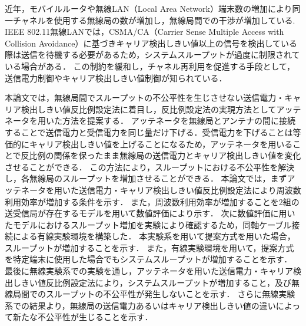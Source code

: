 \documentclass[master]{kuisthesis}		%
\date{平成28年2月8日}				%
\begin{document}
\maketitle					%

\begin{jabstract}				%
近年，モバイルルータや無線LAN（Local Area Network）端末数の増加により同一チャネルを使用する無線局の数が増加し，無線局間での干渉が増加している. 
IEEE 802.11無線LANでは，CSMA/CA（Carrier Sense Multiple Access with Collision Avoidance）に基づきキャリア検出しきい値以上の信号を検出している際は送信を待機する必要があるため，システムスループットが過度に制限されている場合がある．
この制約を緩和し，チャネル再利用を促進する手段として，送信電力制御やキャリア検出しきい値制御が知られている．

本論文では，無線局間でスループットの不公平性を生じさせない送信電力・キャリア検出しきい値反比例設定法に着目し，反比例設定法の実現方法としてアッテネータを用いた方法を提案する．
アッテネータを無線局とアンテナの間に接続することで送信電力と受信電力を同じ量だけ下げる．受信電力を下げることは等価的にキャリア検出しきい値を上げることになるため，アッテネータを用いることで反比例の関係を保ったまま無線局の送信電力とキャリア検出しきい値を変化させることができる．
この方法により，スループットにおける不公平性を解決し，各無線局のスループットを増加させることができる．
本論文では，まずアッテネータを用いた送信電力・キャリア検出しきい値反比例設定法により周波数利用効率が増加する条件を示す．
また，周波数利用効率が増加することを2組の送受信局が存在するモデルを用いて数値評価により示す．
次に数値評価に用いたモデルにおけるスループット増加を実験により確認するため，同軸ケーブル接続による有線実験環境を構築した．
本実験系を用いて提案方式を用いた場合，スループットが増加することを示す．
また，有線実験環境を用いて，提案方式を特定端末に使用した場合でもシステムスループットが増加することを示す．
最後に無線実験系での実験を通し，アッテネータを用いた送信電力・キャリア検出しきい値反比例設定法により，システムスループットが増加すること，及び無線局間でのスループットの不公平性が発生しないことを示す．
さらに無線実験系での結果より，無線局の送信電力あるいはキャリア検出しきい値の違いによって新たな不公平性が生じることを示す．

 

\end{jabstract}
\end{document}
